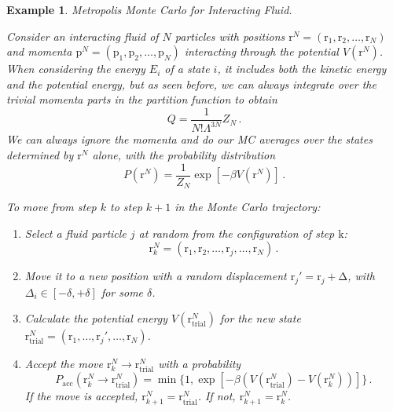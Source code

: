 \documentclass{article}
\theoremstyle{plain}\theoremheaderfont{\normalfont\itshape}\theorembodyfont{\rmfamily}\theoremseparator{.}\newtheorem*{rem}{Remark}\newtheorem*{ex}{Example}\newtheorem*{proof}{Proof}\newtheorem*{altp}{Alternative proof}
\theoremstyle{plain}\theoremheaderfont{\normalfont\bfseries}\theorembodyfont{\rmfamily}\theoremseparator{.}\newtheorem{thm}{Theorem}[section]\newtheorem{lem}[thm]{Lemma}\newtheorem{prop}[thm]{Proposition}\newtheorem*{cor}{Corollary}\newtheorem{defn}[thm]{Definition}\newtheorem{clm}[thm]{Claim}\newtheorem{clminproof}{Claim}\newtheorem{alg}[thm]{Algorithm}\newtheorem{hyp}[thm]{Hypothesis}\newtheorem{law}[thm]{Law}
\theoremstyle{break}\theoremheaderfont{\normalfont\itshape}\theorembodyfont{\rmfamily}\theoremseparator{.\medskip}\newtheorem*{proofskip}{Proof}\newtheorem*{exs}{Examples}\newtheorem*{rems}{Remarks}
\theoremstyle{break}\theoremheaderfont{\normalfont\bfseries}\theorembodyfont{\rmfamily}\theoremseparator{.\medskip}\newtheorem{lemskip}[thm]{Lemma}\newtheorem{defnskip}[thm]{Definition}\newtheorem{propskip}[thm]{Proposition}\newtheorem{thmskip}[thm]{Theorem}
\numberwithin{equation}{section}
\newcommand{\vb}[1]{\bm{\mathrm{#1}}}
\begin{document}
    \begin{ex}
        \textit{Metropolis Monte Carlo for Interacting Fluid.}
        
        Consider an interacting fluid of \(N\) particles with positions \(\vb{r}^N=(\vb{r}_1,\vb{r}_2,\dots,\vb{r}_N)\) and momenta \(\vb{p}^N=(\vb{p}_1,\vb{p}_2,\dots,\vb{p}_N)\) interacting through the potential \(V(\vb{r}^N)\). When considering the energy \(E_i\) of a state \(i\), it includes both the kinetic energy and the potential energy, but as seen before, we can always integrate over the trivial momenta parts in the partition function to obtain
        \begin{equation}
            Q=\frac{1}{N!\Lambda^{3N}}Z_N\,.
        \end{equation}
        We can always ignore the momenta and do our MC averages over the states determined by \(\vb{r}^N\) alone, with the probability distribution
        \begin{equation}
            P(\vb{r}^N)=\frac{1}{Z_N}\exp[-\beta V(\vb{r}^N)]\,.
        \end{equation}

        To move from step \(k\) to step \(k+1\) in the Monte Carlo trajectory:
        \begin{enumerate}
            \item Select a fluid particle \(j\) at random from the configuration of step \(\vb{k}\):
            \begin{equation}
                \vb{r}_k^N=(\vb{r}_1,\vb{r}_2,\dots,\vb{r}_j,\dots,\vb{r}_N)\,.
            \end{equation}
            \item Move it to a new position with a random displacement \(\vb{r}_j'=\vb{r}_j+\vb{\Delta}\), with \(\Delta_i\in[-\delta,+\delta]\) for some \(\delta\).
            \item Calculate the potential energy \(V(\vb{r}_{\text{trial}}^{N})\) for the new state \(\vb{r}_{\text{trial}}^N=(\vb{r}_1,\dots,\vb{r}_j',\dots,\vb{r}_N)\).
            \item Accept the move \(\vb{r}_k^N\to\vb{r}_{\text{trial}}^N\) with a probability
            \begin{equation}
                P_{\text{acc}}(\vb{r}_k^N\to\vb{r}_{\text{trial}}^N)=\min\{1,\exp[-\beta(V(\vb{r}_{\text{trial}}^N)-V(\vb{r}_k^N))]\}\,.
            \end{equation}
            If the move is accepted, \(\vb{r}_{k+1}^N=\vb{r}_{\text{trial}}^N\). If not, \(\vb{r}_{k+1}^N=\vb{r}_k^N\).
        \end{enumerate}


\end{ex}
\end{document}
